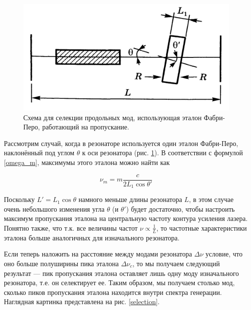 \documentclass[12pt]{kiarticle}
\begin{document}
\begin{figure} 
	\includegraphics[width=\linewidth]{FP_selection}
	\caption{Схема для селекции продольных мод, использующая эталон 	Фабри-Перо, работающий на пропускание.}
	\label{FP_selection}
\end{figure}

Рассмотрим случай, когда в резонаторе используется один эталон Фабри-Перо, наклонённый под углом $ \theta $ к оси резонатора (рис. \ref{FP_selection}). В соответствии с формулой \eqref{omega_m}, максимумы этого эталона можно найти как 

\begin{equation}\label{}
\nu_m = m \dfrac{c}{2L_1 \cos \theta'}
\end{equation}

Поскольку $ L' = L_1 \cos \theta $ намного меньше длины резонатора $ L $, в этом случае очень небольшого изменения угла $ \theta $ (и $ \theta' $) будет достаточно, чтобы настроить максимум пропускания эталона на центральную частоту контура усиления лазера. Понятно также, что т.к. все величины частот $ \nu \propto \frac{1}{L} $, то частотные характеристики эталона больше аналогичных для изначального резонатора. 

Если теперь наложить на расстояние между модами резонатора $ \Delta \nu $ условие, что оно больше полуширины пика эталона $ \Delta \nu_c $, то мы получаем следующий результат --- пик пропускания эталона оставляет лишь одну моду изначального резонатора, т.е. он селектирует ее. Таким образом, мы получаем столько мод, сколько пиков пропускания эталона находится внутри спектра генерации. Наглядная картинка представлена на рис. \ref{selection}. 
\end{document}
